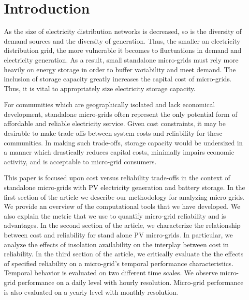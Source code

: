 \documentclass{article}
\begin{document}
\begin{abstract}

\end{abstract}

\section{Introduction}

As the size of electricity distribution networks is decreased,
so is the diversity of demand sources and 
the diversity of generation.
Thus, the smaller an electricity distribution grid, the more vulnerable 
it becomes to fluctuations in demand and electricity generation.
As a result, small standalone micro-grids must rely more heavily on
energy storage in order to buffer variability and meet demand.  
The inclusion of storage capacity greatly increases the capital cost of micro-grids.
Thus, it is vital to appropriately size electricity storage capacity.

For communities which are geographically isolated and lack economical development, standalone micro-grids often represent the only potential form of affordable and reliable electricity service. 
Given cost constraints, it may be desirable to make trade-offs between system costs and reliability for these communities. 
In making such trade-offs, storage capacity would be undersized in a manner which 
drastically %
reduces capital costs, minimally impairs economic activity, and is acceptable to micro-grid consumers. 

This paper is focused upon cost versus reliability trade-offs in
the context of standalone micro-grids with PV electricity generation
and battery storage. 
In the first section of the article we describe our methodology 
for analyzing micro-grids. 
We provide an overview of the computational tools that we have developed.
We also explain the metric that we use to quantify micro-grid reliability
and is advantages.
In the second section of the article, we characterize the relationship 
between cost and reliability for stand alone PV micro-grids. 
In particular, we analyze the effects of insolation availability on 
the interplay between cost in reliability. 
In the third section of the article, we critically evaluate the 
the effects of specified reliability on a micro-grid's temporal performance 
characteristics. 
Temporal behavior is evaluated on two different time scales. 
We observe micro-grid performance on a daily level with hourly resolution. 
Micro-grid performance is also evaluated on a yearly level 
with monthly resolution. 
\end{document}

